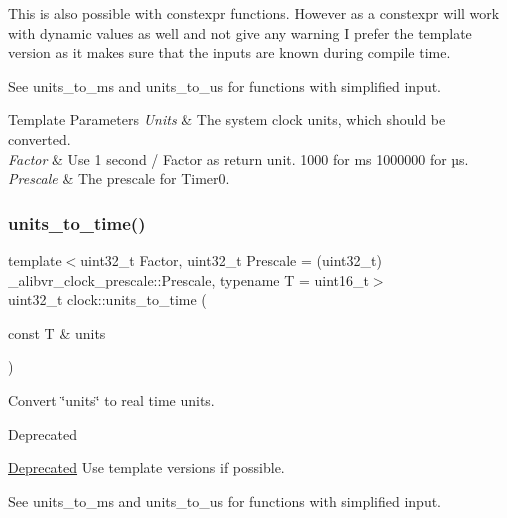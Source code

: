This is also possible with {\ttfamily constexpr} functions. However as a {\ttfamily constexpr} will work with dynamic values as well and not give any warning I prefer the template version as it makes sure that the inputs are known during compile time.

See units\+\_\+to\+\_\+ms and units\+\_\+to\+\_\+us for functions with simplified input.


\begin{DoxyTemplParams}{Template Parameters}
{\em Units} & The system clock units, which should be converted. \\
\hline
{\em Factor} & Use 1 second / Factor as return unit. 1\textquotesingle{}000 for ms 1\textquotesingle{}000\textquotesingle{}000 for µs. \\
\hline
{\em Prescale} & The prescale for {\ttfamily Timer0}. \\
\hline
\end{DoxyTemplParams}
\hypertarget{namespaceclock_afadc978b0b25983f61b85b53ae468a51}{}\label{namespaceclock_afadc978b0b25983f61b85b53ae468a51} 
\subsubsection{\texorpdfstring{units\+\_\+to\+\_\+time()}{units\_to\_time()}\hspace{0.1cm}{\footnotesize\ttfamily [2/2]}}
{\footnotesize\ttfamily template$<$uint32\+\_\+t Factor, uint32\+\_\+t Prescale = (uint32\+\_\+t) \+\_\+alibvr\+\_\+clock\+\_\+prescale\+::\+Prescale, typename T  = uint16\+\_\+t$>$ \\
uint32\+\_\+t clock\+::units\+\_\+to\+\_\+time (\begin{DoxyParamCaption}\item[{const T \&}]{units }\end{DoxyParamCaption})\hspace{0.3cm}{\ttfamily [inline]}}



Convert \char`\"{}units\char`\"{} to real time units. 

\begin{DoxyRefDesc}{Deprecated}
\item[\hyperlink{deprecated__deprecated000001}{Deprecated}]Use template versions if possible.\end{DoxyRefDesc}


See units\+\_\+to\+\_\+ms and units\+\_\+to\+\_\+us for functions with simplified input.


